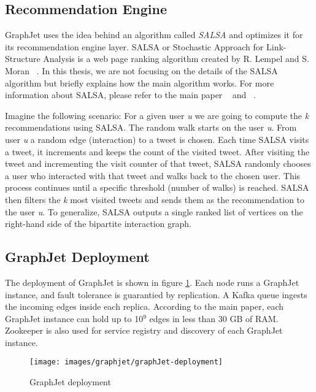 \subsection{Recommendation Engine}
\label{subsec:GraphJet-Recommendation-Engine}
GraphJet uses the idea behind an algorithm called \emph{SALSA} and optimizes it for its recommendation engine layer. SALSA or Stochastic Approach for Link-Structure Analysis is a web page ranking algorithm created by R. Lempel and S. Moran ~\cite{lempel2001salsa}. In this thesis, we are not focusing on the details of the SALSA algorithm but briefly explains how the main algorithm works. For more information about SALSA, please refer to the main paper ~\cite{lempel2001salsa} and ~\cite{sharma2016graphjet}.

Imagine the following scenario: For a given user \textit{u} we are going to compute the \textit{k} recommendations using SALSA. The random walk starts on the user \textit{u}. From user \textit{u} a random edge (interaction) to a tweet is chosen. Each time SALSA visits a tweet, it increments and keeps the count of the visited tweet. After visiting the tweet and incrementing the visit counter of that tweet, SALSA randomly chooses a user who interacted with that tweet and walks back to the chosen user. This process continues until a specific threshold (number of walks) is reached. SALSA then filters the \textit{k} most visited tweets and sends them as the recommendation to the user \textit{u}. To generalize, SALSA outputs a  single ranked list of vertices on the right-hand side of the bipartite interaction graph.

\subsection{GraphJet Deployment}
\label{subsec:GraphJet-Deployment}
The deployment of GraphJet is shown in figure \ref{fig:graphJet-deployment}. Each node runs a GraphJet instance, and fault tolerance is guarantied by replication. A Kafka queue ingests the incoming edges inside each replica. According to the main paper, each GraphJet instance can hold up to 10$^9$ edges in less than 30 GB of RAM. Zookeeper is also used for service registry and discovery of each GraphJet instance.
\begin{figure}[!h]
	\centering
	\texttt{[image: images/graphjet/graphJet-deployment]}
	\caption{GraphJet deployment}
	\label{fig:graphJet-deployment}
\end{figure}

